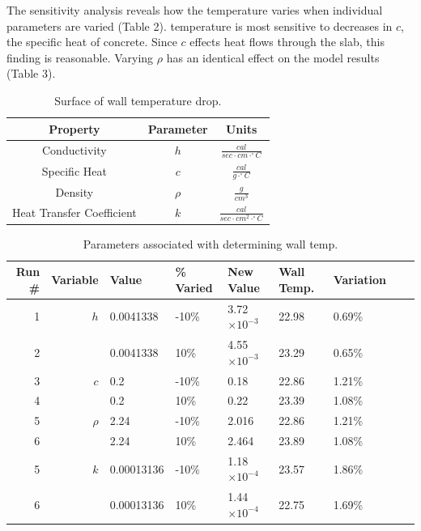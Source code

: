 \documentclass[titlepage,11pt]{article}
\begin{document}
The sensitivity analysis reveals how the temperature varies when
individual parameters are varied (Table 2). temperature is most
sensitive to decreases in $c$, the specific heat of concrete.  Since
$c$ effects heat flows through the slab, this finding is reasonable.
Varying $\rho$ has an identical effect on the model results (Table
3).

\begin{table}[!h]
\caption{Surface of wall temperature drop.}
\begin{center}
\begin{tabular}{|c|c|c|}
\hline {\bf Property}&{\bf Parameter} & {\bf Units}\\
\hline Conductivity &$h$ & $\frac{cal}{sec\cdot cm\cdot ^\circ C}$ \\
\hline Specific Heat &$c$ & $\frac{cal}{g\cdot ^\circ C}$ \\
\hline Density& $\rho$ &$\frac{g}{cm^3}$\\
\hline Heat Transfer Coefficient&$k$ & $\frac{cal}{sec\cdot cm^2\cdot ^\circ C}$\\
\hline
\end{tabular}
\end{center}
\end{table}

\begin{table}[!h]
\begin{center}
\caption{Parameters associated with determining wall temp.}
\begin{tabular}{|r|r|l|l|l|l|l|l|l|}
\hline
{\bf Run \#} & {\bf Variable} & {\bf Value}  & {\bf \% Varied} & {\bf New Value}    & {\bf Wall Temp.}  &{\bf Variation}\\
\hline
         1   &       $h$      &     0.0041338&       -10\%     & 3.72$\times10^{-3}$ &22.98              &0.69\%   \\
         2   &                &     0.0041338&        10\%     & 4.55$\times10^{-3}$ &23.29              &0.65\%   \\
\hline
         3   &     $c$        &      0.2     &       -10\%     &0.18                &22.86              &1.21\%   \\
         4   &                &    0.2       &        10\%     &0.22                &23.39              &1.08\%   \\
\hline
         5   &    $\rho$      &   2.24       &       -10\%     &2.016               &22.86              &1.21\%   \\
         6   &                &    2.24      &        10\%     &2.464               &23.89              &1.08\%   \\
\hline
         5   &    $k$         &   0.00013136 &       -10\%     &1.18$\times10^{-4}$  &23.57              &1.86\%   \\
         6   &                &  0.00013136  &        10\%     &1.44$\times10^{-4}$  &22.75              &1.69\%   \\
\hline
\end{tabular}
\end{center}
\end{table}
\end{document}
